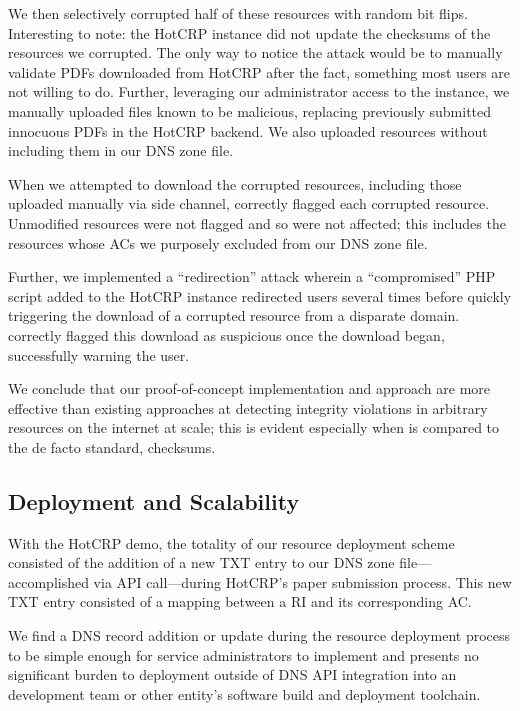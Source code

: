 We then selectively corrupted half of these resources with random bit flips.
Interesting to note: the HotCRP instance did not update the checksums of the
resources we corrupted. The only way to notice the attack would be to manually
validate PDFs downloaded from HotCRP after the fact, something most users are
not willing to do. Further, leveraging our administrator access to the instance,
we manually uploaded files known to be malicious, replacing previously submitted
innocuous PDFs in the HotCRP backend. We also uploaded resources without
including them in our DNS zone file.

When we attempted to download the corrupted resources, including those uploaded
manually via side channel, \SYSTEM{} correctly flagged each corrupted resource.
Unmodified resources were not flagged and so were not affected; this includes
the resources whose ACs we purposely excluded from our DNS zone file.

Further, we implemented a ``redirection'' attack wherein a ``compromised'' PHP
script added to the HotCRP instance redirected users several times before
quickly triggering the download of a corrupted resource from a disparate domain.
\SYSTEM{} correctly flagged this download as suspicious once the download began,
successfully warning the user.

We conclude that our proof-of-concept \SYSTEM{} implementation and approach are
more effective than existing approaches at detecting integrity violations in
arbitrary resources on the internet at scale; this is evident especially when
\SYSTEM{} is compared to the de facto standard, checksums.

\subsection{Deployment and Scalability}

With the HotCRP demo, the totality of our resource deployment scheme consisted
of the addition of a new TXT entry to our DNS zone file---accomplished via API
call---during HotCRP's paper submission process. This new TXT entry consisted of
a mapping between a RI and its corresponding AC.

We find a DNS record addition or update during the resource deployment process
to be simple enough for service administrators to implement and presents no
significant burden to deployment outside of DNS API integration into an
development team or other entity's software build and deployment toolchain.

